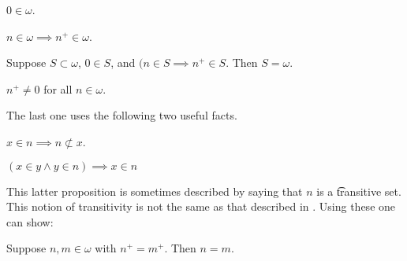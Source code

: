 \begin{proposition}
$0 \in \omega$.\end{proposition}
\begin{proposition}
$n \in \omega \implies n^+ \in \omega$.\end{proposition}
\begin{proposition}
Suppose $S \subset \omega$, $0 \in S$, and $(n \in S \implies n^+ \in S$.
Then $S = \omega$.\end{proposition}
\begin{proposition}
$n^+ \neq 0$ for all $n \in \omega$.\end{proposition}
The last one uses the following two useful facts.

\begin{proposition}
$x \in n \implies n \not\subset x$.\end{proposition}
\begin{proposition}
$(x \in y \land y \in n) \implies x \in n$\end{proposition}
This latter proposition is sometimes described by saying that $n$ is a \t{transitive set}.
This notion of transitivity is not the same as that described in .
Using these one can show:

\begin{proposition}
Suppose $n, m \in \omega$ with $n^+ = m^+$.
Then $n = m$.\end{proposition}